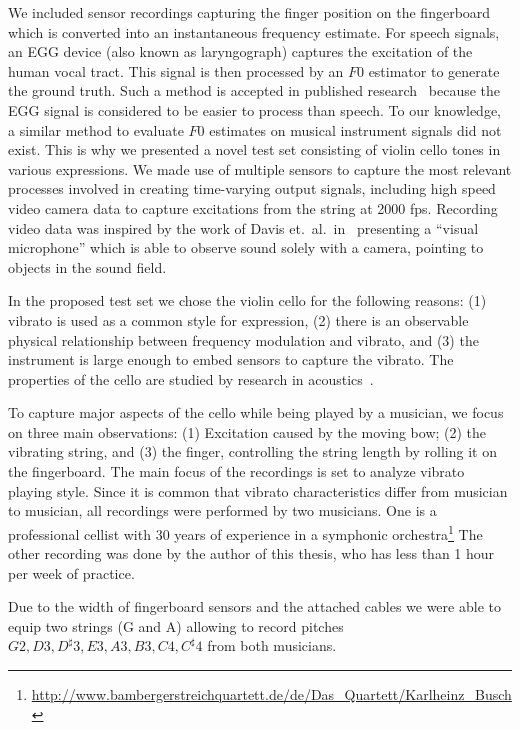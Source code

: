 We included sensor recordings capturing the finger position on the fingerboard which is converted into an instantaneous frequency estimate. 
For speech signals, an EGG device (also known as laryngograph) captures the excitation of the human vocal tract. 
This signal is then processed by an $F0$ estimator to generate the ground truth. 
Such a method is accepted in published research~\cite{pirker11, babacan13} because the EGG signal is considered to be easier to process than speech. 
To our knowledge, a similar method to evaluate $F0$ estimates on musical instrument signals did not exist. 
This is why we presented a novel test set consisting of violin cello tones in various expressions. 
We made use of multiple sensors to capture the most relevant processes involved in creating time-varying output signals, including high speed video camera data to capture excitations from the string at 2000 fps.
Recording video data was inspired by the work of Davis et.\ al.\ in~\cite{Davis2014VisualMic} presenting a ``visual microphone'' which is able to observe sound solely with a camera, pointing to objects in the sound field. 
\par
In the proposed test set we chose the violin cello for the following reasons: (1) vibrato is used as a common style for expression, (2) there is an observable physical relationship between frequency modulation and vibrato, and (3) the instrument is large enough to embed sensors to capture the vibrato. The properties of the cello are studied by research in acoustics~\cite{woodhouse04, woodhouse99}.
\par
To capture major aspects of the cello while being played by a musician, we focus on three main observations: (1) Excitation caused by the moving bow; (2) the vibrating string, and (3) the finger, controlling the string length by rolling it on the fingerboard.
The main focus of the recordings is set to analyze vibrato playing style. Since it is common that vibrato characteristics differ from musician to musician, all recordings were performed by two musicians. One is a professional cellist with 30 years of experience in a symphonic orchestra\footnote{\url{http://www.bambergerstreichquartett.de/de/Das_Quartett/Karlheinz_Busch}} 
The other recording was done by the author of this thesis, who has less than 1 hour per week of practice.
\par
Due to the width of fingerboard sensors and the attached cables we were able to equip two strings (G and A) allowing to record pitches ${G2, D3, D^\sharp3, E3, A3, B3, C4, C^\sharp4}$ from both musicians. 

